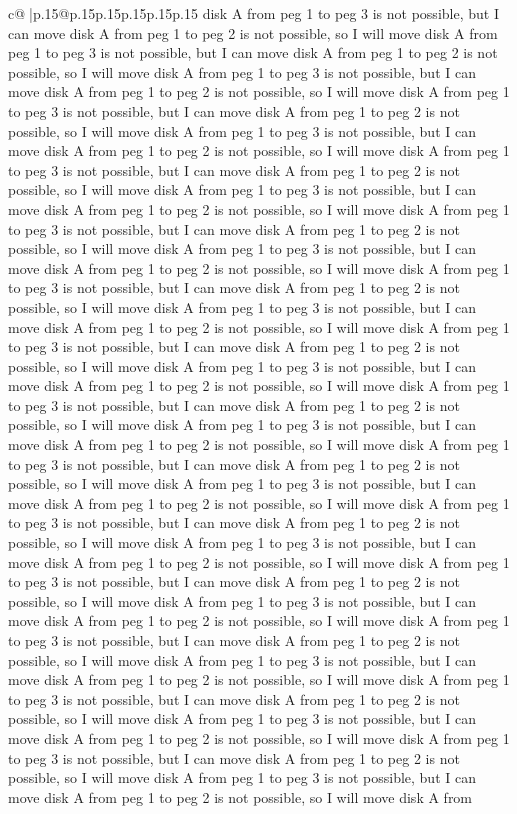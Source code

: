 \documentclass{article}
\begin{document}
{\begin{supertabular}{c@{$\;$}|p{.15\linewidth}@{}p{.15\linewidth}p{.15\linewidth}p{.15\linewidth}p{.15\linewidth}p{.15\linewidth}}
{{{disk A from peg 1 to peg 3 is not possible, but I can move disk A from peg 1 to peg 2 is not possible, so I will move disk A from peg 1 to peg 3 is not possible, but I can move disk A from peg 1 to peg 2 is not possible, so I will move disk A from peg 1 to peg 3 is not possible, but I can move disk A from peg 1 to peg 2 is not possible, so I will move disk A from peg 1 to peg 3 is not possible, but I can move disk A from peg 1 to peg 2 is not possible, so I will move disk A from peg 1 to peg 3 is not possible, but I can move disk A from peg 1 to peg 2 is not possible, so I will move disk A from peg 1 to peg 3 is not possible, but I can move disk A from peg 1 to peg 2 is not possible, so I will move disk A from peg 1 to peg 3 is not possible, but I can move disk A from peg 1 to peg 2 is not possible, so I will move disk A from peg 1 to peg 3 is not possible, but I can move disk A from peg 1 to peg 2 is not possible, so I will move disk A from peg 1 to peg 3 is not possible, but I can move disk A from peg 1 to peg 2 is not possible, so I will move disk A from peg 1 to peg 3 is not possible, but I can move disk A from peg 1 to peg 2 is not possible, so I will move disk A from peg 1 to peg 3 is not possible, but I can move disk A from peg 1 to peg 2 is not possible, so I will move disk A from peg 1 to peg 3 is not possible, but I can move disk A from peg 1 to peg 2 is not possible, so I will move disk A from peg 1 to peg 3 is not possible, but I can move disk A from peg 1 to peg 2 is not possible, so I will move disk A from peg 1 to peg 3 is not possible, but I can move disk A from peg 1 to peg 2 is not possible, so I will move disk A from peg 1 to peg 3 is not possible, but I can move disk A from peg 1 to peg 2 is not possible, so I will move disk A from peg 1 to peg 3 is not possible, but I can move disk A from peg 1 to peg 2 is not possible, so I will move disk A from peg 1 to peg 3 is not possible, but I can move disk A from peg 1 to peg 2 is not possible, so I will move disk A from peg 1 to peg 3 is not possible, but I can move disk A from peg 1 to peg 2 is not possible, so I will move disk A from peg 1 to peg 3 is not possible, but I can move disk A from peg 1 to peg 2 is not possible, so I will move disk A from peg 1 to peg 3 is not possible, but I can move disk A from peg 1 to peg 2 is not possible, so I will move disk A from peg 1 to peg 3 is not possible, but I can move disk A from peg 1 to peg 2 is not possible, so I will move disk A from peg 1 to peg 3 is not possible, but I can move disk A from peg 1 to peg 2 is not possible, so I will move disk A from peg 1 to peg 3 is not possible, but I can move disk A from peg 1 to peg 2 is not possible, so I will move disk A from peg 1 to peg 3 is not possible, but I can move disk A from peg 1 to peg 2 is not possible, so I will move disk A from peg 1 to peg 3 is not possible, but I can move disk A from peg 1 to peg 2 is not possible, so I will move disk A from peg 1 to peg 3 is not possible, but I can move disk A from peg 1 to peg 2 is not possible, so I will move disk A from peg 1 to peg 3 is not possible, but I can move disk A from peg 1 to peg 2 is not possible, so I will move disk A from }}}
\end{supertabular}}
\end{document}
